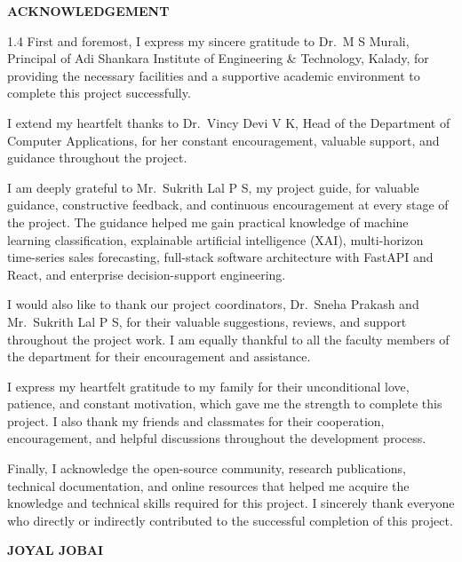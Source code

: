 \documentclass[12pt,a4paper]{article}
\newcommand{\studentname}{JOYAL JOBAI}
\newcommand{\institutionname}{Adi Shankara Institute of Engineering \& Technology}
\newcommand{\guidefname}{Mr.\ Sukrith Lal P S}
\newcommand{\hodname}{Dr.\ Vincy Devi V K}
\newcommand{\principalname}{Dr.\ M S Murali}
\begin{document}
\vspace*{0.3in}
\begin{center}{\large\bfseries ACKNOWLEDGEMENT}\end{center}
\vspace{0.1in}
\begin{spacing}{1.4}
\justifying
First and foremost, I express my sincere gratitude to \principalname, Principal of \institutionname, Kalady, for providing the necessary facilities and a supportive academic environment to complete this project successfully.

I extend my heartfelt thanks to \hodname, Head of the Department of Computer Applications, for her constant encouragement, valuable support, and guidance throughout the project.

I am deeply grateful to \guidefname, my project guide, for valuable guidance, constructive feedback, and continuous encouragement at every stage of the project. The guidance helped me gain practical knowledge of machine learning classification, explainable artificial intelligence (XAI), multi-horizon time-series sales forecasting, full-stack software architecture with FastAPI and React, and enterprise decision-support engineering.

I would also like to thank our project coordinators, Dr.\ Sneha Prakash and \guidefname, for their valuable suggestions, reviews, and support throughout the project work. I am equally thankful to all the faculty members of the department for their encouragement and assistance.

I express my heartfelt gratitude to my family for their unconditional love, patience, and constant motivation, which gave me the strength to complete this project. I also thank my friends and classmates for their cooperation, encouragement, and helpful discussions throughout the development process.

Finally, I acknowledge the open-source community, research publications, technical documentation, and online resources that helped me acquire the knowledge and technical skills required for this project. I sincerely thank everyone who directly or indirectly contributed to the successful completion of this project.
\end{spacing}
\vspace{0.3in}
\noindent\textbf{\studentname}
\newpage
\end{document}
